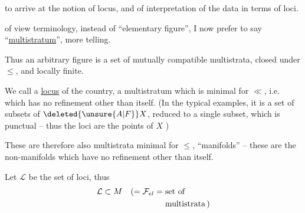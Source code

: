 to arrive at the notion of locus, and of interpretation of the data in terms of loci.

 of view terminology, instead of ``elementary figure'', I now prefer to say ``\uline{multistratum}'', more telling.

Thus an arbitrary figure is a set of mutually compatible multistrata, closed under $\leq$, and locally finite.

 We call a  \uline{locus} of the country, a multistratum which is minimal for $\ll$, i.e. which has no refinement other than itself.     (In the typical examples, it is a set of subsets of $\deleted{\unsure{A|F}}X$, reduced to a single subset, which is punctual -- thus the loci are the points of $X$ )

These are therefore also multistrata minimal for $\leq$,   ``manifolds''  -- these are the  non-manifolds which have no refinement other than itself.

Let $\mathcal{L}$ be the set of loci,  thus
\[
\begin{aligned}
\mathcal{L}\subset M\quad (={}&\mathcal{F}_{el}=\text{set of}\\
&\hphantom{\mathcal{F}_{el}={}}\text{multistrata}\,)
\end{aligned}
\]
